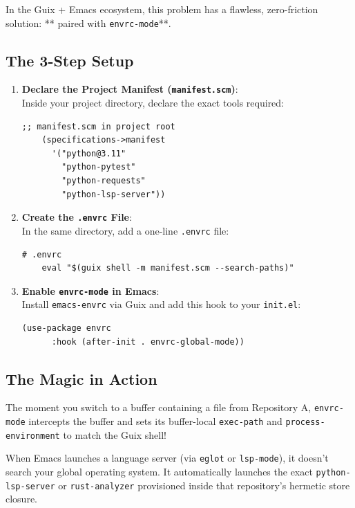 In the Guix + Emacs ecosystem, this problem has a flawless, zero-friction solution: ** paired with \texttt{envrc-mode}**.

\subsection{The 3-Step Setup}

\begin{enumerate}
  \item \textbf{Declare the Project Manifest (\texttt{manifest.scm})}:\\
    Inside your project directory, declare the exact tools required:
    \begin{lstlisting}[style=guixscheme]
    ;; manifest.scm in project root
    (specifications->manifest
      '("python@3.11"
        "python-pytest"
        "python-requests"
        "python-lsp-server"))
    \end{lstlisting}

  \item \textbf{Create the \texttt{.envrc} File}:\\
    In the same directory, add a one-line \texttt{.envrc} file:
    \begin{lstlisting}[style=guixcli]
    # .envrc
    eval "$(guix shell -m manifest.scm --search-paths)"
    \end{lstlisting}

  \item \textbf{Enable \texttt{envrc-mode} in Emacs}:\\
    Install \texttt{emacs-envrc} via Guix and add this hook to your \texttt{init.el}:
    \begin{lstlisting}[style=guixscheme]
    (use-package envrc
      :hook (after-init . envrc-global-mode))
    \end{lstlisting}
\end{enumerate}

\subsection{The Magic in Action}

The moment you switch to a buffer containing a file from Repository A, \texttt{envrc-mode} intercepts the buffer and sets its buffer-local \texttt{exec-path} and \texttt{process-environment} to match the Guix shell!

When Emacs launches a language server (via \texttt{eglot} or \texttt{lsp-mode}), it doesn't search your global operating system. It automatically launches the exact \texttt{python-lsp-server} or \texttt{rust-analyzer} provisioned inside that repository's hermetic store closure.

